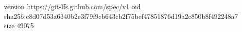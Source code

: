 version https://git-lfs.github.com/spec/v1
oid sha256:c8d07d53a6340b2e3f79f9eb643cb2f75bef47851876d19a2c850b8f492248a7
size 49075
